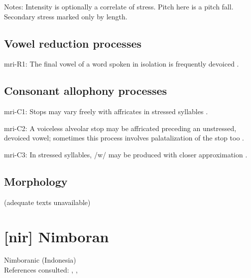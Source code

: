 {\begin{appendixdesc}
\item[Notes:] Intensity is optionally a correlate of stress. Pitch here is a pitch fall. Secondary stress marked only by length.
\end{appendixdesc}
\subsection*{Vowel reduction processes}
\begin{appendixdesc}

\item[mri-R1:] The final vowel of a word spoken in isolation is frequently devoiced \citep[546]{Bauer1999}.
\end{appendixdesc}
\subsection*{Consonant allophony processes}
\begin{appendixdesc}

\item[mri-C1:] Stops may vary freely with affricates in stressed syllables \citep[545]{Bauer1999}.

\item[mri-C2:] A voiceless alveolar stop may be affricated preceding an unstressed, devoiced vowel; sometimes this process involves palatalization of the stop too \citep{Bauer1999}.

\item[mri-C3:] In stressed syllables, /w/ may be produced with closer approximation \citep[545]{Bauer1999}.
\end{appendixdesc}
\subsection*{Morphology}

(adequate texts unavailable)
\section*{[nir] Nimboran}   %
Nimboranic (Indonesia)\medskip\\
References consulted: \citet{Anceaux1965}, \citet{May1997}, \citet{MayMay1981}

}
